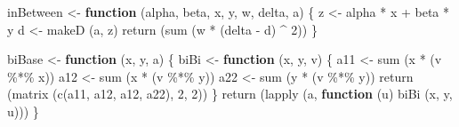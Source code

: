 \documentclass[
  12pt,
]{book}
\newenvironment{Shaded}{\begin{snugshade}}{\end{snugshade}}
\newcommand{\ControlFlowTok}[1]{\textcolor[rgb]{0.13,0.29,0.53}{\textbf{#1}}}
\newcommand{\DecValTok}[1]{\textcolor[rgb]{0.00,0.00,0.81}{#1}}
\newcommand{\FunctionTok}[1]{\textcolor[rgb]{0.00,0.00,0.00}{#1}}
\newcommand{\NormalTok}[1]{#1}
\newcommand{\OtherTok}[1]{\textcolor[rgb]{0.56,0.35,0.01}{#1}}
\newcommand{\SpecialCharTok}[1]{\textcolor[rgb]{0.00,0.00,0.00}{#1}}
\theoremstyle{definition}
\theoremstyle{definition}
\theoremstyle{definition}
\theoremstyle{definition}
\theoremstyle{remark}
\begin{document}
\begin{Shaded}
\begin{Highlighting}[]
\NormalTok{inBetween }\OtherTok{\textless{}{-}} \ControlFlowTok{function}\NormalTok{ (alpha, beta, x, y, w, delta, a) \{}
\NormalTok{  z }\OtherTok{\textless{}{-}}\NormalTok{ alpha }\SpecialCharTok{*}\NormalTok{ x }\SpecialCharTok{+}\NormalTok{ beta }\SpecialCharTok{*}\NormalTok{ y}
\NormalTok{  d }\OtherTok{\textless{}{-}} \FunctionTok{makeD}\NormalTok{ (a, z)}
  \FunctionTok{return}\NormalTok{ (}\FunctionTok{sum}\NormalTok{ (w }\SpecialCharTok{*}\NormalTok{ (delta }\SpecialCharTok{{-}}\NormalTok{ d) }\SpecialCharTok{\^{}} \DecValTok{2}\NormalTok{))}
\NormalTok{\}}

\NormalTok{biBase }\OtherTok{\textless{}{-}} \ControlFlowTok{function}\NormalTok{ (x, y, a) \{}
\NormalTok{  biBi }\OtherTok{\textless{}{-}} \ControlFlowTok{function}\NormalTok{ (x, y, v) \{}
\NormalTok{    a11 }\OtherTok{\textless{}{-}} \FunctionTok{sum}\NormalTok{ (x }\SpecialCharTok{*}\NormalTok{ (v }\SpecialCharTok{\%*\%}\NormalTok{ x))}
\NormalTok{    a12 }\OtherTok{\textless{}{-}} \FunctionTok{sum}\NormalTok{ (x }\SpecialCharTok{*}\NormalTok{ (v }\SpecialCharTok{\%*\%}\NormalTok{ y))}
\NormalTok{    a22 }\OtherTok{\textless{}{-}} \FunctionTok{sum}\NormalTok{ (y }\SpecialCharTok{*}\NormalTok{ (v }\SpecialCharTok{\%*\%}\NormalTok{ y))}
    \FunctionTok{return}\NormalTok{ (}\FunctionTok{matrix}\NormalTok{ (}\FunctionTok{c}\NormalTok{(a11, a12, a12, a22), }\DecValTok{2}\NormalTok{, }\DecValTok{2}\NormalTok{))}
\NormalTok{  \}}
  \FunctionTok{return}\NormalTok{ (}\FunctionTok{lapply}\NormalTok{ (a, }\ControlFlowTok{function}\NormalTok{ (u)}
    \FunctionTok{biBi}\NormalTok{ (x, y, u)))}
\NormalTok{\}}


\end{Highlighting}
\end{Shaded}
\end{document}
